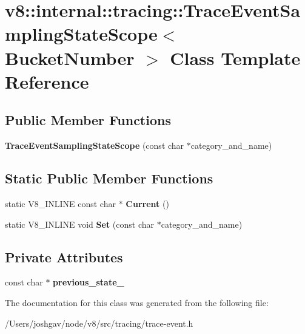 \hypertarget{classv8_1_1internal_1_1tracing_1_1_trace_event_sampling_state_scope}{}\section{v8\+:\+:internal\+:\+:tracing\+:\+:Trace\+Event\+Sampling\+State\+Scope$<$ Bucket\+Number $>$ Class Template Reference}
\label{classv8_1_1internal_1_1tracing_1_1_trace_event_sampling_state_scope}
\subsection*{Public Member Functions}
\begin{DoxyCompactItemize}
\item 
{\bfseries Trace\+Event\+Sampling\+State\+Scope} (const char $\ast$category\+\_\+and\+\_\+name)\hypertarget{classv8_1_1internal_1_1tracing_1_1_trace_event_sampling_state_scope_a429d4bb70b2397c026a859843719cc25}{}\label{classv8_1_1internal_1_1tracing_1_1_trace_event_sampling_state_scope_a429d4bb70b2397c026a859843719cc25}

\end{DoxyCompactItemize}
\subsection*{Static Public Member Functions}
\begin{DoxyCompactItemize}
\item 
static V8\+\_\+\+I\+N\+L\+I\+NE const char $\ast$ {\bfseries Current} ()\hypertarget{classv8_1_1internal_1_1tracing_1_1_trace_event_sampling_state_scope_ac6f3da1e6d3ad61166833d9b2272e0e3}{}\label{classv8_1_1internal_1_1tracing_1_1_trace_event_sampling_state_scope_ac6f3da1e6d3ad61166833d9b2272e0e3}

\item 
static V8\+\_\+\+I\+N\+L\+I\+NE void {\bfseries Set} (const char $\ast$category\+\_\+and\+\_\+name)\hypertarget{classv8_1_1internal_1_1tracing_1_1_trace_event_sampling_state_scope_aaea63088209fecf4a99bb4bd8e2f1b9b}{}\label{classv8_1_1internal_1_1tracing_1_1_trace_event_sampling_state_scope_aaea63088209fecf4a99bb4bd8e2f1b9b}

\end{DoxyCompactItemize}
\subsection*{Private Attributes}
\begin{DoxyCompactItemize}
\item 
const char $\ast$ {\bfseries previous\+\_\+state\+\_\+}\hypertarget{classv8_1_1internal_1_1tracing_1_1_trace_event_sampling_state_scope_a17d2ea99c57f4d1a05b9adc715323c5e}{}\label{classv8_1_1internal_1_1tracing_1_1_trace_event_sampling_state_scope_a17d2ea99c57f4d1a05b9adc715323c5e}

\end{DoxyCompactItemize}


The documentation for this class was generated from the following file\+:\begin{DoxyCompactItemize}
\item 
/\+Users/joshgav/node/v8/src/tracing/trace-\/event.\+h\end{DoxyCompactItemize}
